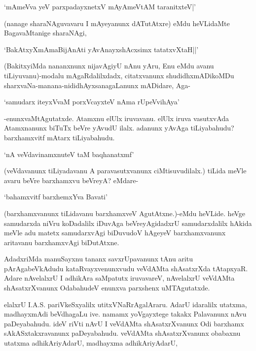 \begin{shloka}
`mAmeVva yeV parxpadayxnetxV mAyAmeVtAM taranitxteV|'
\end{shloka}

(nanage sharaNAguvavaru I mAyeyanunx dATutAtxre) eMdu heVLidaMte BagavaMtanige sharaNAgi,

\begin{shloka}
`BakAtxyXmAmaBijAnAti yAvAnayxshAcxsimx tatatxvXtaH||'
\end{shloka}

(BakitxyiMda nananxnunx nijavAgiyU nAnu yAru, Enu eMdu avanu tiLiyuvanu)-modalu mAgaRdalilxdadx, citatxvanunx shudidhxmADikoMDu sharxvaNa-manana-nididhAyxsanagaLanunx mADidare, Aga-

\begin{shloka}
`samudarx iteyxVvaM porxVcayxteV nAma rUpeVvihAya'
\end{shloka}

-enunxvaMtAgutatxde. Atamxnu elUlx iruvavanu. elUlx iruva vasutxvAda Atamxnanunx biTuTx beVre yAvudU ilalx. adanunx yAvAga tiLiyabahudu? barxhamxvitf mAtarx tiLiyabahudu.

\begin{shloka}
`nA veVdavinamxnuteV taM baqhanatxmf'
\end{shloka}

(veVdavanunx tiLiyadavanu A paravasutxvanunx ciMtisuvudilalx.) tiLida meVle avaru beVre barxhamxvu beVreyA? eMdare-

\begin{shloka}
`bahamxvitf barxhemxYva Bavati'
\end{shloka}

(barxhamxvanunx tiLidavanu barxhamxveV AgutAtxne.)-eMdu heVLide. heVge samudarxda niVru koDadalilx iDuvAga beVreyAgidadxrU samudarxdalilx hAkida meVle adu matetx samudarxvAgi biDuvudoV hAgeyeV barxhamxvanunx aritavanu barxhamxvAgi biDutAtxne.

AdadxriMda manuSayxnu tananx savxrUpavanunx tAnu aritu pArAgabeVkAdudu kataRvayxvenunxvudu veVdAMta shAsatxrXda tAtapxyaR. Adare nAvelalxrU I adhikAra saMpatutx iruvavareV, nAvelalxrU veVdAMta shAsatxrXvanunx OdabahudeV enunxva parxshenx uMTAgutatxde.

elalxrU {\eng I.A.S.} pariVkeSxyalilx utitxVNaRrAgalAraru. AdarU idaralilx utatxma, madhayxmAdi beVdhagaLu ive. namamx yoVgayxtege takakx Palavanunx nAvu paDeyabahudu. ideV riVti nAvU I veVdAMta shAsatxrXvanunx Odi barxhamx sAkASxtakxravanunx paDeyabahudu. veVdAMta shAsatxrXvanunx obabaxnu utatxma adhikAriyAdarU, madhayxma adhikAriyAdarU,

